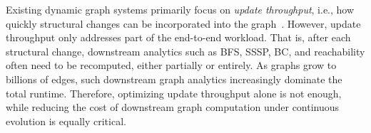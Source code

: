 Existing dynamic graph systems primarily focus on \textit{update throughput}, 
i.e., how quickly structural changes can be incorporated into the 
graph~\cite{ediger2012stinger,busato2018hornet,Awad2020DynamicGPU,fan2025cuckoograph}. 
However, update throughput only addresses part of the end-to-end workload. 
That is, after each structural change, downstream analytics such as BFS, SSSP, BC, 
and reachability often need to be recomputed, either partially or entirely. 
As graphs grow to billions of edges, such downstream graph analytics
increasingly dominate the total runtime. 
Therefore, optimizing update throughput alone is not enough, while reducing the cost of downstream graph computation under 
continuous evolution is equally critical.





